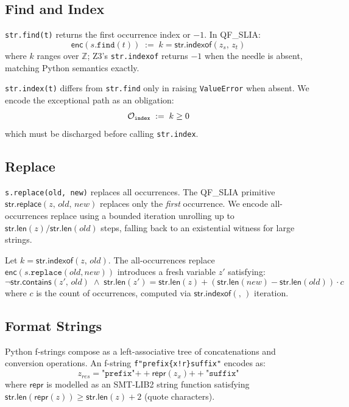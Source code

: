 \documentclass[11pt]{article}
\newcommand{\QFSLIA}{\textsf{QF\_SLIA}}
\newcommand{\strlen}[1]{\ensuremath{\mathsf{str.len}(#1)}}
\newcommand{\strconcat}[2]{\ensuremath{#1 \mathbin{+\!\!+} #2}}
\newcommand{\strcont}[2]{\ensuremath{\mathsf{str.contains}(#1,\,#2)}}
\newcommand{\strreplace}[3]{\ensuremath{\mathsf{str.replace}(#1,\,#2,\,#3)}}
\newcommand{\strindexof}[2]{\ensuremath{\mathsf{str.indexof}(#1,\,#2)}}
\newcommand{\encode}{\ensuremath{\mathsf{enc}}}
\begin{document}
\subsection{Find and Index}
\label{sec:find}

\texttt{str.find(t)} returns the first occurrence index or $-1$.  In
\QFSLIA:
\[
  \encode(s\texttt{.find}(t)) \;:=\;
  k = \strindexof{z_s}{z_t}
\]
where $k$ ranges over $\mathbb{Z}$; Z3's \texttt{str.indexof} returns $-1$
when the needle is absent, matching Python semantics exactly.

\texttt{str.index(t)} differs from \texttt{str.find} only in raising
\texttt{ValueError} when absent.  We encode the exceptional path as an
obligation:
\[
  \mathcal{O}_{\texttt{index}} \;:=\; k \geq 0
\]
which must be discharged before calling \texttt{str.index}.

\subsection{Replace}
\label{sec:replace}

\texttt{s.replace(old, new)} replaces all occurrences.  The \QFSLIA{}
primitive $\strreplace{z}{\mathit{old}}{\mathit{new}}$ replaces only the
\emph{first} occurrence.  We encode all-occurrences replace using a bounded
iteration unrolling up to $\strlen{z} / \strlen{\mathit{old}}$ steps, falling
back to an existential witness for large strings.

\begin{definition}
\label{def:replace}
Let $k = \strindexof{z}{\mathit{old}}$.  The all-occurrences replace
$\encode(s\texttt{.replace}(\mathit{old}, \mathit{new}))$ introduces a fresh
variable $z'$ satisfying:
\[
  \neg\strcont{z'}{old}
  \;\wedge\;
  \strlen{z'} = \strlen{z} + (\strlen{new} - \strlen{old}) \cdot c
\]
where $c$ is the count of occurrences, computed via $\strindexof{}{}$
iteration.
\end{definition}

\subsection{Format Strings}
\label{sec:format}

Python f-strings compose as a left-associative tree of concatenations and
conversion operations.  An f-string \texttt{f"prefix\{x!r\}suffix"} encodes as:
\[
  z_{\mathit{res}} =
    \strconcat{
      \strconcat{\texttt{"prefix"}}{\mathsf{repr}(z_x)}
    }{\texttt{"suffix"}}
\]
where $\mathsf{repr}$ is modelled as an SMT-LIB2 string function satisfying
$\strlen{\mathsf{repr}(z)} \geq \strlen{z} + 2$ (quote characters).
\end{document}
